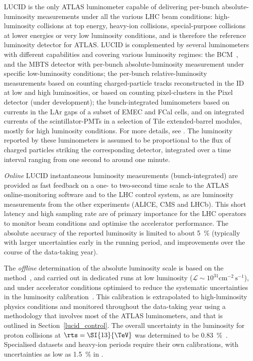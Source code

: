 \documentclass[cernpreprint, atlasdraft=false, UKenglish,british,orcidlogo, texmf, orcidlogo]{atlasdoc}
\begin{document}
\gls{LUCID} is the only ATLAS luminometer capable of delivering per-bunch absolute-luminosity measurements under all the various \gls{LHC} beam conditions: high-luminosity \pp collisions at top energy, heavy-ion collisions, special-purpose \pp collisions at lower energies or very low luminosity conditions, and is therefore the reference luminosity detector for ATLAS. \gls{LUCID} is complemented by several luminometers with different capabilities and covering various luminosity regimes: the \gls{BCM}~\cite{BCM}, and the \gls{MBTS} detector with per-bunch absolute-luminosity measurement under specific low-luminosity conditions; the per-bunch relative-luminosity measurements based on counting charged-particle tracks reconstructed in the \gls{ID} at low and high luminosities, or based on counting pixel-clusters in the Pixel detector (under development); the bunch-integrated luminometers based on currents in the \gls{LAr} gaps of a subset of \gls{EMEC} and \gls{FCal} cells, and on integrated currents of the scintillator-\glspl{PMT} in a selection of \gls{Tile} extended-barrel modules, mostly for high luminosity conditions. For more details, see \Sect{\ref{lucid_control}}.
The luminosity reported by these luminometers is assumed to be proportional to the flux of charged particles striking the corresponding detector, integrated over a time interval ranging from one second to around one minute.
 
\emph{Online} \gls{LUCID} instantaneous luminosity measurements (bunch-integrated) are provided as fast feedback on a one- to two-second time scale to the ATLAS online-monitoring software and to the \gls{LHC} control system, as are luminosity measurements from the other  experiments (\acrshort{ALICE}, \acrshort{CMS} and \acrshort{LHCb}). This short latency and high sampling rate are of primary importance for the \gls{LHC} operators to monitor beam conditions and optimise the accelerator performance. The absolute accuracy of the reported luminosity is limited to about \SI{5}{\percent} (typically with larger uncertainties early in the running period, and improvements over the course of the data-taking year).
 
The \emph{offline} determination of the absolute luminosity scale is based on the  method~\cite{vdm}, and carried out in dedicated runs at low luminosity ($\mathcal{L} \sim 10^{31}\mathrm{cm^{-2}\,s^{-1}}$), and under accelerator conditions optimised to reduce the systematic uncertainties in the luminosity calibration~\cite{DAPR-2013-01, ATLAS-CONF-2019-021}. This calibration is extrapolated to high-luminosity physics conditions and monitored throughout the data-taking year using a methodology that involves most of the ATLAS luminometers, and that is outlined in Section~\ref{lucid_control}.
The overall uncertainty in the luminosity for proton collisions at $\rts=\SI{13}{\TeV}$  was determined to be \SI{0.83}{\percent}~\cite{DAPR-2021-01}.
Specialised \pp datasets and heavy-ion periods require their own calibrations, with uncertainties as low as \SI{1.5}{\percent} in \RunTwo.
 
\end{document}
